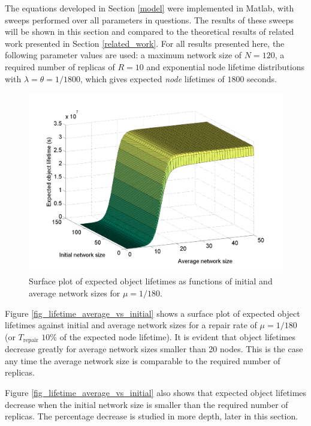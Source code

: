\documentclass[10pt,a4paper,conference]{IEEEtran}
\begin{document}
The equations developed in Section \ref{model} were implemented in Matlab, with sweeps performed over all parameters in questions. The results of these sweeps will be shown in this section and compared to the theoretical results of related work presented in Section \ref{related_work}. For all results presented here, the following parameter values are used: a maximum network size of $N=120$, a required number of replicas of $R = 10$ and exponential node lifetime distributions with $\lambda = \theta = 1/1800$, which gives expected \emph{node} lifetimes of $1800$ seconds.


\begin{figure}[htbp]
 \centering
 \includegraphics[clip=true, viewport=2.0cm 1.0cm 27.5cm 19.15cm, width=\columnwidth]{lifetime_av_init_groupsize}
 \caption{Surface plot of expected object lifetimes as functions of initial and average network sizes for $\mu = 1/180$.}
 \label{fig_lifetime_average_vs_initial_rep}
\end{figure}

Figure \ref{fig_lifetime_average_vs_initial} shows a surface plot of expected object lifetimes against initial and average network sizes for a repair rate of $\mu = 1/180$ (or $T_{\textrm{repair}}$ $10\%$ of the expected node lifetime). It is evident that object lifetimes decrease greatly for average network sizes smaller than 20 nodes. This is the case any time the average network size is comparable to the required number of replicas.

Figure \ref{fig_lifetime_average_vs_initial} also shows that expected object lifetimes decrease when the initial network size is smaller than the required number of replicas. The percentage decrease is studied in more depth, later in this section.
\end{document}
